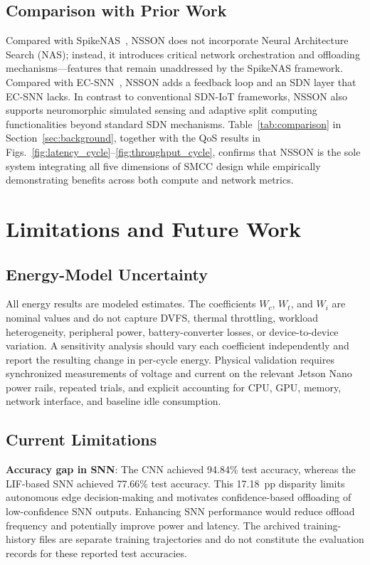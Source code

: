 \documentclass[journal]{IEEEtran}
\begin{document}
\subsection{Comparison with Prior Work}
Compared with SpikeNAS~\cite{putra2025spikenas}, NSSON does not incorporate Neural Architecture Search (NAS); instead, it introduces critical network orchestration and offloading mechanisms—features that remain unaddressed by the SpikeNAS framework. Compared with EC-SNN~\cite{di2024ec}, NSSON adds a feedback loop and an SDN layer that EC-SNN lacks. In contrast to conventional SDN-IoT frameworks, NSSON also supports neuromorphic simulated sensing and adaptive split computing functionalities beyond standard SDN mechanisms.  
Table~\ref{tab:comparison} in Section~\ref{sec:background}, together with the QoS results in Figs.~\ref{fig:latency_cycle}–\ref{fig:throughput_cycle}, confirms that NSSON is the sole system integrating all five dimensions of SMCC design while empirically demonstrating benefits across both compute and network metrics.

\section{Limitations and Future Work}
\label{sec:limitations}

\subsection{Energy-Model Uncertainty}
\label{sec:energyuncertainty}

All energy results are modeled estimates. The coefficients $W_c$, $W_t$, and $W_i$ are nominal values and do not capture DVFS, thermal throttling, workload heterogeneity, peripheral power, battery-converter losses, or device-to-device variation. A sensitivity analysis should vary each coefficient independently and report the resulting change in per-cycle energy. Physical validation requires synchronized measurements of voltage and current on the relevant Jetson Nano power rails, repeated trials, and explicit accounting for CPU, GPU, memory, network interface, and baseline idle consumption.

\subsection{Current Limitations}

\textbf{Accuracy gap in SNN}: The CNN achieved 94.84\% test accuracy, whereas the LIF-based SNN achieved 77.66\% test accuracy. This 17.18~pp disparity limits autonomous edge decision-making and motivates confidence-based offloading of low-confidence SNN outputs. Enhancing SNN performance would reduce offload frequency and potentially improve power and latency. The archived training-history files are separate training trajectories and do not constitute the evaluation records for these reported test accuracies.
\end{document}
